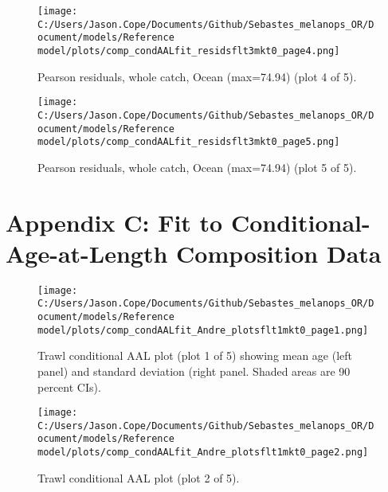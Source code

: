 \documentclass[11pt,
  letterpaper,
]{article}
\begin{document}
\begin{figure}
{\centering
\texttt{[image: C:/Users/Jason.Cope/Documents/Github/Sebastes\_melanops\_OR/Document/models/Reference model/plots/comp\_condAALfit\_residsflt3mkt0\_page4.png]}
}
\caption{Pearson residuals, whole catch, Ocean (max=74.94) (plot 4 of 5).\label{fig:comp_condAALfit_residsflt3mkt0_page4}}
\end{figure}

\begin{figure}
{\centering
\texttt{[image: C:/Users/Jason.Cope/Documents/Github/Sebastes\_melanops\_OR/Document/models/Reference model/plots/comp\_condAALfit\_residsflt3mkt0\_page5.png]}
}
\caption{Pearson residuals, whole catch, Ocean (max=74.94) (plot 5 of 5).\label{fig:comp_condAALfit_residsflt3mkt0_page5}}
\end{figure}

\clearpage

\hypertarget{app-c}{%
\section{Appendix C: Fit to Conditional-Age-at-Length Composition Data}\label{app-c}}

\begin{figure}
{\centering
\texttt{[image: C:/Users/Jason.Cope/Documents/Github/Sebastes\_melanops\_OR/Document/models/Reference model/plots/comp\_condAALfit\_Andre\_plotsflt1mkt0\_page1.png]}
}
\caption{Trawl conditional AAL plot (plot 1 of 5) showing mean age (left panel) and standard deviation (right panel. Shaded areas are 90 percent CIs).\label{fig:comp_condAALfit_Andre_plotsflt1mkt0_page1}}
\end{figure}

\begin{figure}
{\centering
\texttt{[image: C:/Users/Jason.Cope/Documents/Github/Sebastes\_melanops\_OR/Document/models/Reference model/plots/comp\_condAALfit\_Andre\_plotsflt1mkt0\_page2.png]}
}
\caption{Trawl conditional AAL plot (plot 2 of 5).\label{fig:comp_condAALfit_Andre_plotsflt1mkt0_page2}}
\end{figure}
\end{document}
